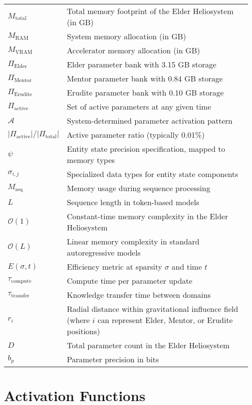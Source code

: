 \begin{tabular}{p{3cm} p{12cm}}
$M_{\text{total}}$ & Total memory footprint of the Elder Heliosystem (in GB) \\
$M_{\text{RAM}}$ & System memory allocation (in GB) \\
$M_{\text{VRAM}}$ & Accelerator memory allocation (in GB) \\
$\Pi_{\text{Elder}}$ & Elder parameter bank with 3.15 GB storage \\
$\Pi_{\text{Mentor}}$ & Mentor parameter bank with 0.84 GB storage \\
$\Pi_{\text{Erudite}}$ & Erudite parameter bank with 0.10 GB storage \\
$\Pi_{\text{active}}$ & Set of active parameters at any given time \\
$\mathcal{A}$ & System-determined parameter activation pattern \\
$|\Pi_{\text{active}}|/|\Pi_{\text{total}}|$ & Active parameter ratio (typically 0.01\%) \\
$\psi$ & Entity state precision specification, mapped to memory types \\
$\sigma_{i,j}$ & Specialized data types for entity state components \\
$M_{\text{seq}}$ & Memory usage during sequence processing \\
$L$ & Sequence length in token-based models \\
$\mathcal{O}(1)$ & Constant-time memory complexity in the Elder Heliosystem \\
$\mathcal{O}(L)$ & Linear memory complexity in standard autoregressive models \\
$E(\sigma,t)$ & Efficiency metric at sparsity $\sigma$ and time $t$ \\
$\tau_{\text{compute}}$ & Compute time per parameter update \\
$\tau_{\text{transfer}}$ & Knowledge transfer time between domains \\
$r_i$ & Radial distance within gravitational influence field (where $i$ can represent Elder, Mentor, or Erudite positions) \\
$D$ & Total parameter count in the Elder Heliosystem \\
$b_p$ & Parameter precision in bits \\
\end{tabular}

\section*{Activation Functions}

